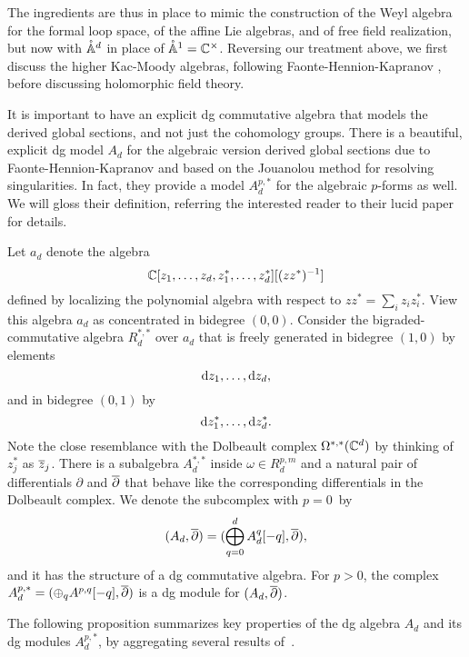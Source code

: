\documentclass[11pt]{amsart}
\def\pAA{\mathring{\AA}}
\begin{document}
The ingredients are thus in place to mimic the construction of the Weyl algebra for the formal loop space, of the affine Lie algebras, and of free field realization, but now with $\pAA^d$ in place of $\pAA^1 = \CC^\times$.
Reversing our treatment above, we first discuss the higher Kac-Moody algebras, 
following Faonte-Hennion-Kapranov \cite{FHK},
before discussing holomorphic field theory.

It is important to have an explicit dg commutative algebra that models the derived global sections,
and not just the cohomology groups.
There is a beautiful, explicit dg model $A_d$ for the algebraic version derived global sections due to Faonte-Hennion-Kapranov \cite{FHK} and based on the Jouanolou method for resolving singularities. 
In fact, they provide a model $A^{p,*}_d$ for the algebraic $p$-forms as well.
We will gloss their definition, referring the interested reader to their lucid paper for details.

Let $a_d$ denote the algebra  
\[
\mathbb C[z_1,\ldots,z_d, z_1^*,\ldots,z_d^*][(z z^*)^{-1}]
\]
defined by localizing the polynomial algebra with respect to $zz^* = \sum_i z_i z^*_i$.
View this algebra $a_d$ as concentrated in bidegree $(0,0)$.
Consider the bigraded-commutative algebra $R^{*,*}_d$ over $a_d$ that is freely generated in bidegree $(1,0)$ by elements
\[
{\rm d} z_1,\ldots , {\rm d} z_d,
\] 
and in bidegree $(0,1)$ by
\[
{\rm d} z_1^*,\ldots, {\rm d} z_d^*.
\]
Note the close resemblance with the Dolbeault complex $\Omega^{*,*}(\mathbb C^d)$ by thinking of $z_j^*$ as ${\overline{z}}_j$.
There is a subalgebra $A^{*,*}_d$ inside $\omega \in R^{p,m}_d$ and a natural pair of differentials $\partial$ and ${\overline{\partial}}$ that behave like the corresponding differentials in the Dolbeault complex.
We denote the subcomplex with $p=0$~by 
\[
(A_d, {\overline{\partial}}) = (\bigoplus_{q = 0}^d A_d^{q}[-q], {\overline{\partial}}),
\] 
and it has the structure of a dg commutative algebra.
For $p>0$, the complex $A^{p,*}_d = (\oplus_q A^{p,q}[-q], {\overline{\partial}})$ is a dg module for $(A_d, {\overline{\partial}})$.

The following proposition summarizes key properties of the dg algebra $A_d$ and its dg modules $A_{d}^{p,*}$,
by aggregating several results of~\cite{FHK}.
\end{document}
